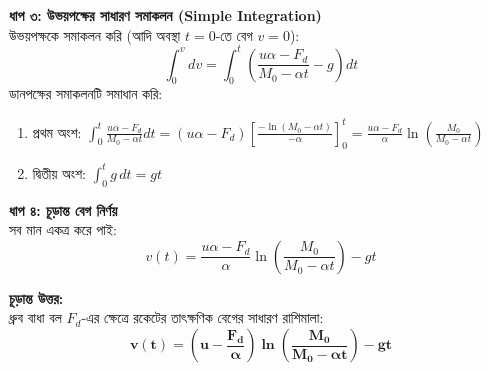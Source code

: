 \documentclass[12pt, a4paper]{article}
\begin{document}
\begin{tcolorbox}[solutionbox={সমাধান (Solution)}]
\vspace{0.5em}
\noindent
\textbf{ধাপ ৩: উভয়পক্ষের সাধারণ সমাকলন (Simple Integration)} \\
উভয়পক্ষকে সমাকলন করি (আদি অবস্থা $t = 0$-তে বেগ $v = 0$):
\[ \int_{0}^{v} dv = \int_{0}^{t} \left( \frac{u \alpha - F_d}{M_0 - \alpha t} - g \right) dt \]
ডানপক্ষের সমাকলনটি সমাধান করি:
\begin{enumerate}[leftmargin=*, parsep=0.3ex]
    \item প্রথম অংশ: $\int_{0}^{t} \frac{u \alpha - F_d}{M_0 - \alpha t} dt = (u \alpha - F_d) \left[ \frac{-\ln(M_0 - \alpha t)}{-\alpha} \right]_0^t = \frac{u \alpha - F_d}{\alpha} \ln\left(\frac{M_0}{M_0 - \alpha t}\right)$
    \item দ্বিতীয় অংশ: $\int_{0}^{t} g \, dt = gt$
\end{enumerate}

\vspace{0.5em}
\noindent
\textbf{ধাপ ৪: চূড়ান্ত বেগ নির্ণয়} \\
সব মান একত্র করে পাই:
\[ v(t) = \frac{u \alpha - F_d}{\alpha} \ln\left(\frac{M_0}{M_0 - \alpha t}\right) - gt \]

\vspace{1em}
\begin{tcolorbox}[answerbox]
\textbf{চূড়ান্ত উত্তর:} \\
ধ্রুব বাধা বল $F_d$-এর ক্ষেত্রে রকেটের তাৎক্ষণিক বেগের সাধারণ রাশিমালা:
\[ \mathbf{v(t) = \left( u - \frac{F_d}{\alpha} \right) \ln\left( \frac{M_0}{M_0 - \alpha t} \right) - gt} \]
\end{tcolorbox}
\end{tcolorbox}
\end{document}
